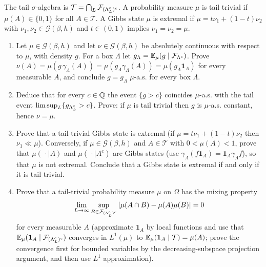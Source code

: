 \begin{exercise}
The tail $\sigma$-algebra is $\mathcal T=\bigcap_{L}\mathcal F_{(\Lambda_L^{\rm c})^c}$.
A probability measure $\mu$ is tail trivial if $\mu(A)\in\{0,1\}$ for all
$A\in\mathcal T$.  A Gibbs state $\mu$ is extremal if $\mu=t\nu_1+(1-t)\nu_2$
with $\nu_1,\nu_2\in\mathcal G(\beta,h)$ and $t\in(0,1)$ implies $\nu_1=\nu_2=\mu$.
\begin{enumerate}[label=(\alph*)]
\item Let $\mu\in\mathcal G(\beta,h)$ and let $\nu\in\mathcal G(\beta,h)$ be
absolutely continuous with respect to $\mu$, with density $g$.  For a box
$\Lambda$ let $g_\Lambda=\mathbb E_\mu(g\mid\mathcal F_{\Lambda^c})$.  Prove
$\nu(A)=\mu(g\,\gamma_\Lambda(A))=\mu(g_\Lambda\gamma_\Lambda(A))=\mu(g_\Lambda\mathbf 1_A)$
for every measurable $A$, and conclude $g=g_\Lambda$ $\mu$-a.s. for every box $\Lambda$.
\item Deduce that for every $c\in\mathbb Q$ the event $\{g>c\}$ coincides
$\mu$-a.s. with the tail event $\limsup_L\{g_{\Lambda_L^{\rm c}}>c\}$.  Prove: if
$\mu$ is tail trivial then $g$ is $\mu$-a.s. constant, hence $\nu=\mu$.
\item Prove that a tail-trivial Gibbs state is extremal (if
$\mu=t\nu_1+(1-t)\nu_2$ then $\nu_1\ll\mu$).  Conversely, if
$\mu\in\mathcal G(\beta,h)$ and $A\in\mathcal T$ with $0<\mu(A)<1$, prove that
$\mu(\,\cdot\mid A)$ and $\mu(\,\cdot\mid A^c)$ are Gibbs states (use
$\gamma_\Lambda(f\mathbf 1_A)=\mathbf 1_A\gamma_\Lambda f$), so that $\mu$ is not
extremal.  Conclude that a Gibbs state is extremal if and only if it is tail
trivial.
\item Prove that a tail-trivial probability measure $\mu$ on $\Omega$ has
the mixing property
\[
 \lim_{L\to\infty}\sup_{B\in\mathcal F_{(\Lambda_L^{\rm c})^c}}
 \left\lvert \mu(A\cap B)-\mu(A)\mu(B)\right\rvert=0
\]
for every measurable $A$ (approximate $\mathbf 1_A$ by local functions and use
that $\mathbb E_\mu(\mathbf 1_A\mid\mathcal F_{(\Lambda_L^{\rm c})^c})$ converges in $L^1(\mu)$
to $\mathbb E_\mu(\mathbf 1_A\mid\mathcal T)=\mu(A)$; prove the convergence first for bounded variables by the decreasing-subspace projection argument, and then use $L^1$ approximation).
\end{enumerate}
\end{exercise}


